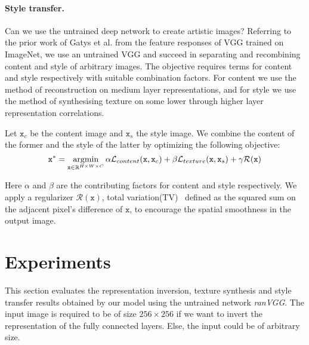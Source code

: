 \documentclass{article}
\begin{document}
\paragraph{Style transfer.} Can we use the untrained deep network to create artistic images? Referring to the prior work of Gatys et al.\cite{Gatys2015Style} from the feature responses of VGG trained on ImageNet, we use an untrained VGG and succeed in separating and recombining content and style of arbitrary images.
The objective requires terms for content and style respectively with suitable combination factors.
For content we use the method of reconstruction on medium layer representations, and for style we use the method of synthesising texture on some lower through higher layer representation correlations.


Let $\texttt{x}_c$ be the content image and $\texttt{x}_s$ the style image. We combine the content of the former and the style of the latter by optimizing the following objective:
\setlength{\belowdisplayskip}{2pt}
\setlength{\abovedisplayskip}{2pt}
\begin{equation}
\texttt{x}^* = \operatornamewithlimits{argmin}_{ \texttt{x} \in \mathbb{R}^{H \times W \times C} }
\alpha \mathcal{L}_{content}(\texttt{x}, \texttt{x}_c) + \beta \mathcal{L}_{texture}(\texttt{x}, \texttt{x}_s) + \gamma \mathcal{R} (\texttt{x})
\label{eq:artLoss}
\end{equation}

Here $\alpha$ and $\beta$ are the contributing factors for content and style respectively. We apply a regularizer $\mathcal{R} (\texttt{x})$, total variation(TV)~\cite{Mahendran2015CVPR} defined as the squared sum on the adjacent pixel's difference of $\texttt{x}$, to encourage the spatial smoothness in the output image.


\vspace{-0.5em}
\section{Experiments}

This section evaluates the representation inversion, texture synthesis and style transfer results obtained by our model using the untrained network \emph{ranVGG}.
The input image is required to be of size $256 \times 256$ if we want to invert the representation of the fully connected layers. Else, the input could be of arbitrary size.
\end{document}
